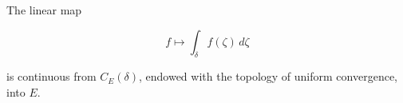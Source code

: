 The linear map

$$f \mapsto \int_{\delta} f(\zeta) \, d\zeta$$

is continuous from $C_E(\delta)$, endowed with the topology of uniform convergence, into $E$.
